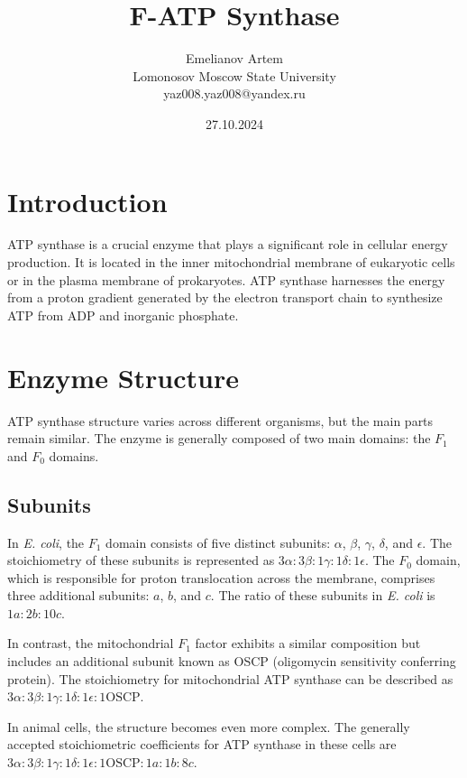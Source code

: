 \documentclass{article}
\title{F-ATP Synthase}
\author{Emelianov Artem \\ Lomonosov Moscow State University \\ yaz008.yaz008@yandex.ru}
\date{27.10.2024}
\begin{document}
\maketitle

\section{Introduction}

ATP synthase is a crucial enzyme that plays a significant role in cellular energy production. It is located in the inner mitochondrial membrane of eukaryotic cells or in the plasma membrane of prokaryotes. ATP synthase harnesses the energy from a proton gradient generated by the electron transport chain to synthesize ATP from ADP and inorganic phosphate. 

\section{Enzyme Structure}

ATP synthase structure varies across different organisms, but the main parts remain similar. The enzyme is generally composed of two main domains: the \textit{$F_1$} and \textit{$F_0$} domains.

\subsection{Subunits}

In \textit{E. coli}, the \textit{$F_1$} domain consists of five distinct subunits: $\alpha$, $\beta$, $\gamma$, $\delta$, and $\epsilon$. The stoichiometry of these subunits is represented as $3\alpha : 3\beta : 1\gamma : 1\delta : 1\epsilon$. The \textit{$F_0$} domain, which is responsible for proton translocation across the membrane, comprises three additional subunits: $a$, $b$, and $c$. The ratio of these subunits in \textit{E. coli} is $1a : 2b : 10c$.

In contrast, the mitochondrial \textit{$F_1$} factor exhibits a similar composition but includes an additional subunit known as OSCP (oligomycin sensitivity conferring protein). The stoichiometry for mitochondrial ATP synthase can be described as $3\alpha : 3\beta : 1\gamma : 1\delta : 1\epsilon : 1\text{OSCP}$.

In animal cells, the structure becomes even more complex. The generally accepted stoichiometric coefficients for ATP synthase in these cells are $3\alpha : 3\beta : 1\gamma : 1\delta : 1\epsilon : 1\text{OSCP} : 1a : 1b : 8c$.
\end{document}
